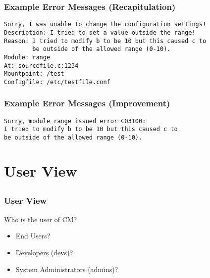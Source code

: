 \begin{frame}[fragile]
	\frametitle{Example Error Messages (Recapitulation)}
\begin{verbatim}
Sorry, I was unable to change the configuration settings!
Description: I tried to set a value outside the range!
Reason: I tried to modify b to be 10 but this caused c to
        be outside of the allowed range (0-10).
Module: range
At: sourcefile.c:1234
Mountpoint: /test
Configfile: /etc/testfile.conf
\end{verbatim}
\end{frame}

\begin{frame}[fragile]
	\frametitle{Example Error Messages (Improvement)}
\begin{verbatim}
Sorry, module range issued error C03100:
I tried to modify b to be 10 but this caused c to
be outside of the allowed range (0-10).
\end{verbatim}
\end{frame}




\section{User View}

\subsection{}

\begin{frame}
	\frametitle{User View}

	Who is the user of CM?

	\begin{itemize}[<+-| alert@+>]
	\item End Users?
	\item Developers (devs)?
	\item System Administrators (admins)?
	\end{itemize}
\end{frame}

